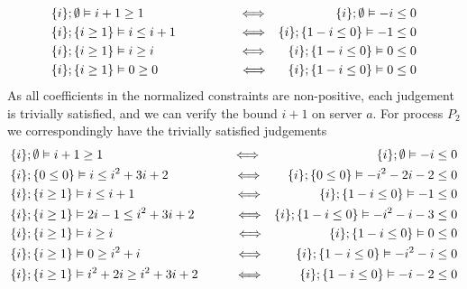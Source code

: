 \begin{examp}
%
\begin{align*}
    &\{i\};\emptyset\vDash i + 1 \geq 1\kern7.5em\Longleftrightarrow &  \{i\};\emptyset\vDash -i \leq 0\\
    &\{i\};\{i \geq 1\} \vDash i \leq i + 1\kern5em\Longleftrightarrow &  \{i\};\{1-i \leq 0\} \vDash -1 \leq 0\\
    &\{i\};\{i \geq 1\} \vDash i \geq i\kern6.7em\Longleftrightarrow &  \{i\};\{1-i \leq 0\} \vDash 0 \leq 0\\
    &\{i\};\{i \geq 1\} \vDash 0 \geq 0\kern6.45em\Longleftrightarrow &  \{i\};\{1-i \leq 0\} \vDash 0 \leq 0
\end{align*}
%
As all coefficients in the normalized constraints are non-positive, each judgement is trivially satisfied, and we can verify the bound $i + 1$ on server $a$. For process $P_2$ we correspondingly have the trivially satisfied judgements
\begin{align*}
    &\{i\};\emptyset\vDash i + 1 \geq 1\kern10.3em\Longleftrightarrow &  \{i\};\emptyset\vDash -i \leq 0\\
    &\{i\};\{0 \leq 0\}\vDash i \leq i^2 + 3i + 2\kern5.2em\Longleftrightarrow &  \{i\};\{0\leq 0\}\vDash -i^2-2i-2 \leq 0\\
    &\{i\};\{i \geq 1\} \vDash i \leq i + 1\kern7.9em\Longleftrightarrow &  \{i\};\{1-i \leq 0\} \vDash -1 \leq 0\\
    &\{i\};\{i \geq 1\} \vDash 2i-1 \leq i^2 + 3i + 2\kern3.2em\Longleftrightarrow &  \{i\};\{1-i \leq 0\} \vDash -i^2-i-3 \leq 0\\
    &\{i\};\{i \geq 1\} \vDash i \geq i\kern9.7em\Longleftrightarrow &  \{i\};\{1-i \leq 0\} \vDash 0 \leq 0\\
    &\{i\};\{i \geq 1\} \vDash 0 \geq i^2+i\kern7.5em\Longleftrightarrow &  \{i\};\{1-i \leq 0\} \vDash -i^2-i \leq 0\\
    &\{i\};\{i \geq 1\} \vDash i^2+2i \geq i^2+3i+2\kern2.9em\Longleftrightarrow &  \{i\};\{1-i \leq 0\} \vDash -i-2 \leq 0
\end{align*}

\end{examp}

